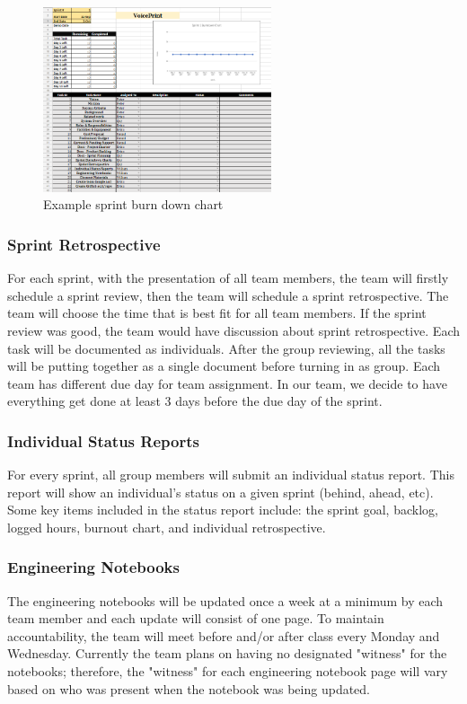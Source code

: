 \begin{figure}[h!]
	\centering
   	\includegraphics[width=0.6\textwidth]{images/Chart.png}
    \caption{Example sprint burn down chart}
\end{figure}

\newpage\subsubsection{Sprint Retrospective}
For each sprint, with the presentation of all team members, the team will firstly schedule a sprint review, then the team will schedule a sprint retrospective. The team will choose the time that is best fit for all team members. If the sprint review was good, the team would have discussion about sprint retrospective. Each task will be documented as individuals. After the group reviewing, all the tasks will be putting together as a single document before turning in as group. Each team has different due day for team assignment. In our team, we decide to have everything get done at least 3 days before the due day of the sprint.

\subsubsection{Individual Status Reports}
For every sprint, all group members will submit an individual status report. This report will show an individual's status on a given sprint (behind, ahead, etc). Some key items included in the status report include: the sprint goal, backlog, logged hours, burnout chart, and individual retrospective.

\subsubsection{Engineering Notebooks}
The engineering notebooks will be updated once a week at a minimum by each team member and each update will consist of one page. To maintain accountability, the team will meet before and/or after class every Monday and Wednesday. Currently the team plans on having no designated "witness" for the notebooks; therefore, the "witness" for each engineering notebook page will vary based on who was present when the notebook was being updated.

